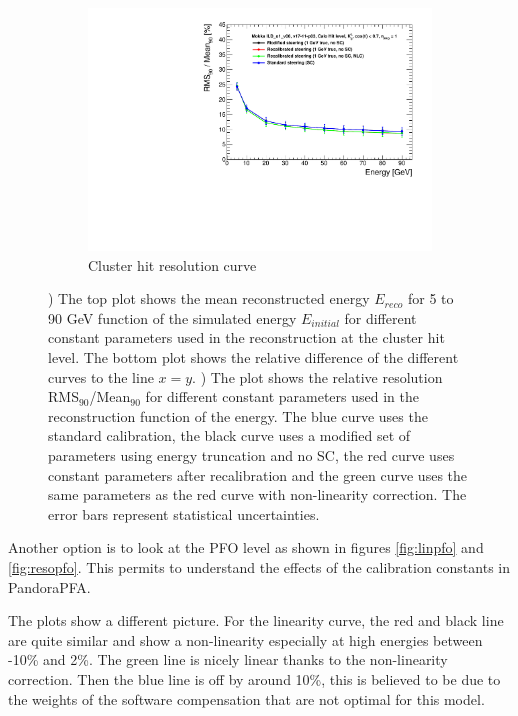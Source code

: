 \begin{figure}[htbp!]
\begin{subfigure}[t]{0.45\textwidth}
    \includegraphics[width=1\linewidth]{../Thesis_Plots/ILD/NoSmearing/Plots_Comparison/Comparison_resolution_Curves_Hits}
    \caption{Cluster hit resolution curve} \label{fig:resohits}
  \end{subfigure}
  \caption{) The top plot shows the mean reconstructed energy $E_{reco}$ for 5 to 90 GeV \kzeroL{} function of the simulated energy $E_{initial}$ for different constant parameters used in the reconstruction at the cluster hit level. The bottom plot shows the relative difference of the different curves to the line $x = y$. ) The plot shows the relative resolution RMS$_{90}$/Mean$_{90}$ for different constant parameters used in the reconstruction function of the energy. The blue curve uses the standard calibration, the black curve uses a modified set of parameters using energy truncation and no SC, the red curve uses constant parameters after recalibration and the green curve uses the same parameters as the red curve with non-linearity correction. The error bars represent statistical uncertainties.}
\end{figure}

Another option is to look at the PFO level as shown in figures \ref{fig:linpfo} and \ref{fig:resopfo}. This permits to understand the effects of the calibration constants in PandoraPFA.

The plots show a different picture. For the linearity curve, the red and black line are quite similar and show a non-linearity especially at high energies between -10\% and 2\%. The green line is nicely linear thanks to the non-linearity correction. Then the blue line is off by around 10\%, this is believed to be due to the weights of the software compensation that are not optimal for this model.


